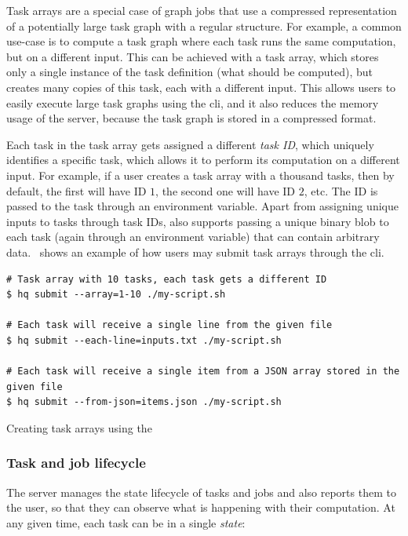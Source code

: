 Task arrays are a special case of graph jobs that use a compressed representation of a potentially
large task graph with a regular structure. For example, a common use-case is to compute a task
graph where each task runs the same computation, but on a different input. This can be achieved
with a task array, which stores only a single instance of the task definition (what should be
computed), but creates many copies of this task, each with a different input. This allows users to
easily execute large task graphs using the \gls{cli}, and it also reduces the memory
usage of the server, because the task graph is stored in a compressed format.

Each task in the task array gets assigned a different \emph{task ID}, which uniquely
identifies a specific task, which allows it to perform its computation on a different input. For
example, if a user creates a task array with a thousand tasks, then by default, the first will have
ID $1$, the second one will have ID $2$, etc. The ID is
passed to the task through an environment variable. Apart from assigning unique inputs to tasks
through task IDs, \hq{} also supports passing a unique binary blob to each task
(again through an environment variable) that can contain arbitrary data.~
shows an example of how users may submit task arrays through the \gls{cli}.

\begin{listing}[h]
	\begin{verbatim}
# Task array with 10 tasks, each task gets a different ID
$ hq submit --array=1-10 ./my-script.sh

# Each task will receive a single line from the given file
$ hq submit --each-line=inputs.txt ./my-script.sh

# Each task will receive a single item from a JSON array stored in the given file
$ hq submit --from-json=items.json ./my-script.sh
	\end{verbatim}
	\caption{Creating task arrays using the \hyperqueue{} }
	\label{lst:hq-cli-task-arrays}
\end{listing}

\subsubsection*{Task and job lifecycle}
The server manages the state lifecycle of tasks and jobs and also reports them to the user, so that
they can observe what is happening with their computation. At any given time, each task can be in a
single \emph{state}:

